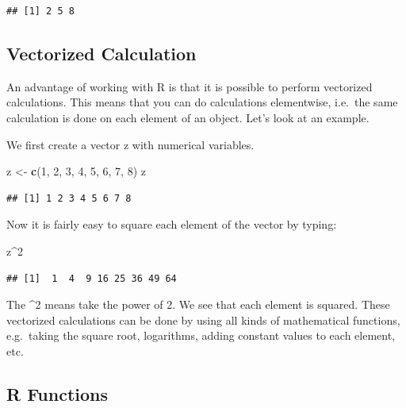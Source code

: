 \documentclass[]{book}
\newenvironment{Shaded}{\begin{snugshade}}{\end{snugshade}}
\newcommand{\KeywordTok}[1]{\textcolor[rgb]{0.13,0.29,0.53}{\textbf{#1}}}
\newcommand{\DecValTok}[1]{\textcolor[rgb]{0.00,0.00,0.81}{#1}}
\newcommand{\StringTok}[1]{\textcolor[rgb]{0.31,0.60,0.02}{#1}}
\newcommand{\OperatorTok}[1]{\textcolor[rgb]{0.81,0.36,0.00}{\textbf{#1}}}
\newcommand{\NormalTok}[1]{#1}
\theoremstyle{definition}
\theoremstyle{definition}
\theoremstyle{definition}
\theoremstyle{remark}
\begin{document}
\begin{verbatim}
## [1] 2 5 8
\end{verbatim}

\subsection{Vectorized Calculation}\label{vectorized-calculation}

An advantage of working with R is that it is possible to perform
vectorized calculations. This means that you can do calculations
elementwise, i.e.~the same calculation is done on each element of an
object. Let's look at an example.

We first create a vector z with numerical variables.

\begin{Shaded}
\begin{Highlighting}[]
\NormalTok{z <-}\StringTok{ }\KeywordTok{c}\NormalTok{(}\DecValTok{1}\NormalTok{, }\DecValTok{2}\NormalTok{, }\DecValTok{3}\NormalTok{, }\DecValTok{4}\NormalTok{, }\DecValTok{5}\NormalTok{, }\DecValTok{6}\NormalTok{, }\DecValTok{7}\NormalTok{, }\DecValTok{8}\NormalTok{)}
\NormalTok{z}
\end{Highlighting}
\end{Shaded}

\begin{verbatim}
## [1] 1 2 3 4 5 6 7 8
\end{verbatim}

Now it is fairly easy to square each element of the vector by typing:

\begin{Shaded}
\begin{Highlighting}[]
\NormalTok{z}\OperatorTok{^}\DecValTok{2}
\end{Highlighting}
\end{Shaded}

\begin{verbatim}
## [1]  1  4  9 16 25 36 49 64
\end{verbatim}

The \^{}2 means take the power of 2. We see that each element is
squared. These vectorized calculations can be done by using all kinds of
mathematical functions, e.g.~taking the square root, logarithms, adding
constant values to each element, etc.

\subsection{R Functions}\label{r-functions}
\end{document}
